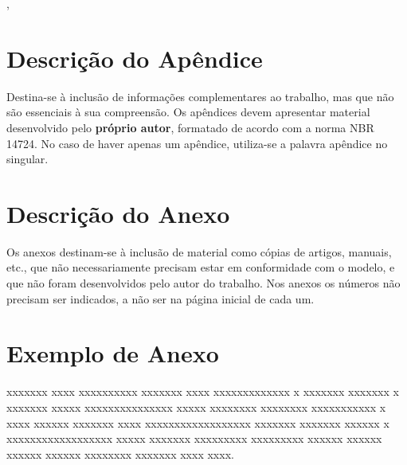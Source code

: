 \documentclass[ppgc,diss]{iiufrgs}
\begin{document}

\nocite{goncalves}
\nocite{lisboa}
\nocite{high}
\nocite{krieger},
\nocite{goncalves2}
\nocite{pedrosa}





\appendix

\chapter*{Descrição do Apêndice}

Destina-se à inclusão de informações complementares ao trabalho, mas que não são essenciais à sua compreensão. Os apêndices devem apresentar material desenvolvido pelo \textbf{próprio autor}, formatado de acordo com a norma NBR 14724. No caso de haver apenas um apêndice, utiliza-se a palavra apêndice no singular.

\annex

\chapter{Descrição do Anexo}

Os anexos destinam-se à inclusão de material como cópias de artigos, manuais, etc., que não necessariamente precisam estar em conformidade com o modelo, e que não foram desenvolvidos pelo autor do trabalho. Nos anexos os números não precisam ser indicados, a não ser na página inicial de cada um. 

\chapter{Exemplo de Anexo}

xxxxxxx xxxx xxxxxxxxxx xxxxxxx xxxx xxxxxxxxxxxxx x xxxxxxx xxxxxxx x xxxxxxx xxxxx xxxxxxxxxxxxxxx xxxxx xxxxxxxx xxxxxxxx xxxxxxxxxxx x xxxx xxxxxx xxxxxxx xxxx xxxxxxxxxxxxxxxxxx xxxxxxx xxxxxxx xxxxxx x xxxxxxxxxxxxxxxxxx xxxxx xxxxxxx xxxxxxxxx xxxxxxxxx xxxxxx xxxxxx xxxxxx xxxxxx xxxxxxxx xxxxxxx xxxx xxxx.


\end{document}
